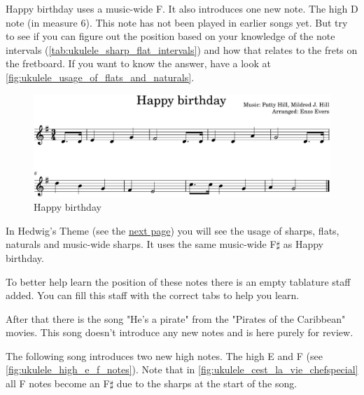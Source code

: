 Happy birthday uses a music-wide F\sharp. It also introduces one new note. The high D note (in measure 6). This note has not been played in earlier songs yet. But try to see if you can figure out the position based on your knowledge of the note intervals (\autoref{tab:ukulele_sharp_flat_intervals}) and how that relates to the frets on the fretboard. If you want to know the answer, have a look at \autoref{fig:ukulele_usage_of_flats_and_naturals}.

\begin{figure}[h]
	\centering
	\includegraphics[width=\textwidth]{../../MuseScore/Ukulele/UkuleleHappyBirthday.png}
	\caption{Happy birthday}
	\label{fig:ukulele_happy_birthday}
\end{figure}

In Hedwig's Theme (see the \hyperlink{UkuleleHarrysPotterHedwigsTheme.pdf.1}{next page}) you will see the usage of sharps, flats, naturals and music-wide sharps. It uses the same music-wide F$\sharp$ as Happy birthday.

To better help learn the position of these notes there is an empty tablature staff added. You can fill this staff with the correct tabs to help you learn.

After that there is the song "He's a pirate" from the "Pirates of the Caribbean" movies. This song doesn't introduce any new notes and is here purely for review.





The following song introduces two new high notes. The high E and F (see \ref{fig:ukulele_high_e_f_notes}). Note that in \autoref{fig:ukulele_cest_la_vie_chefspecial} all F notes become an F$\sharp$ due to the sharps at the start of the song.


